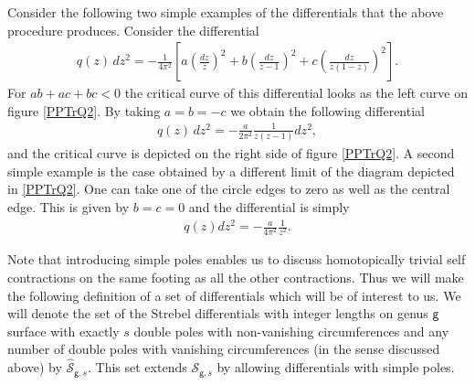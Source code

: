 \documentclass[11pt]{JHEP3}
\def\be{\begin{eqnarray}}
\def\ee{\end{eqnarray}}
\def\gg{\mathsf g }
\begin{document}
Consider the following two simple examples of the  differentials
that the above procedure produces. Consider the differential
\be
q(z)\,dz^2=-\frac{1}{4\pi^2}\left[a\left(\frac{dz}{z}\right)^2+b\left(\frac{dz}{z-1}\right)^2
+c\left(\frac{dz}{z(1-z)}\right)^2\right].
\ee For $ab+ac+bc<0$ the critical curve of this differential looks 
as the left curve on figure \ref{PPTrQ2}. By taking $a=b=-c$ we obtain the following differential
\be
q(z)\,dz^2=-\frac{a}{2\pi^2}\frac{1}{z(z-1)}dz^2,
\ee  and the critical curve is depicted on the right side of figure \ref{PPTrQ2}.
A second simple example is the case obtained by a different limit of the diagram depicted
in \ref{PPTrQ2}. One can take one of the circle edges to zero as well as the central edge.
This is given by $b=c=0$ and the differential is simply
\be
q(z)dz^2=-\frac{a}{4\pi^2}\frac{1}{z^2}.
\ee

Note that introducing simple poles enables us to discuss homotopically trivial 
self contractions on the same footing as all the other contractions.  Thus we will make the following definition
of a set of differentials which will be of interest to us.
We will denote the set of the Strebel differentials  with integer lengths on
genus $\gg$ surface with exactly $s$ double poles with non-vanishing circumferences and any number of double poles with vanishing circumferences
(in the sense discussed above)  by
 $\hat {\mathcal S}_{\gg,s}$. This set extends ${\mathcal S}_{\gg,s}$ by allowing differentials
with simple poles.
\end{document}
